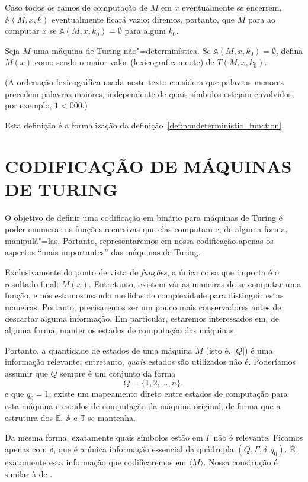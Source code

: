 Caso todos os ramos de computação de $M$ em $x$ eventualmente se encerrem,
$\mathbb A(M, x, k)$ eventualmente ficará vazio;
diremos,
portanto,
que $M$ para ao computar $x$ se $\mathbb A(M, x, k_0) = \emptyset$
para algum $k_0$.

\begin{definition}
    Seja $M$ uma máquina de Turing não"=determinística.
    Se $\mathbb A(M, x, k_0) = \emptyset$,
    defina $M(x)$ como sendo o maior valor
    (lexicograficamente)
    de $T(M, x, k_0)$.
\end{definition}
(A ordenação lexicográfica usada neste texto
considera que palavras menores precedem palavras maiores,
independente de quais símbolos estejam envolvidos;
por exemplo, $1 < 000$.)

Esta definição é a formalização da definição~\ref{def:nondeterministic_function}.

\section{CODIFICAÇÃO DE MÁQUINAS DE TURING}

O objetivo de definir uma codificação em binário para máquinas de Turing
é poder enumerar as funções recursivas que elas computam
e, de alguma forma,
manipulá"=las.
Portanto,
representaremos em nossa codificação apenas os aspectos ``mais importantes''
das máquinas de Turing.

Exclusivamente do ponto de vista de \emph{funções},
a única coisa que importa é o resultado final: $M(x)$.
Entretanto,
existem várias maneiras de se computar uma função,
e nós estamos usando medidas de complexidade para distinguir estas maneiras.
Portanto,
precisaremos ser um pouco mais conservadores antes de descartar alguma informação.
Em particular,
estaremos interessados em,
de alguma forma,
manter os estados de computação das máquinas.

Portanto, a quantidade de estados de uma máquina $M$
(isto é, $|Q|$)
é uma informação relevante;
entretanto,
\emph{quais} estados são utilizados não é.
Poderíamos assumir que $Q$ sempre é um conjunto da forma
\begin{equation*}
    Q = \{1, 2, \dots, n\},
\end{equation*}
e que $q_0 = 1$;
existe um mapeamento direto entre estados de computação para esta máquina
e estados de computação da máquina original,
de forma que a estrutura dos $\mathbb E$, $\mathbb A$ e $\mathbb T$ se mantenha.

Da mesma forma,
exatamente quais símbolos estão em $\Gamma$
não é relevante.
Ficamos apenas com $\delta$,
que é a única informação essencial da quádrupla $(Q, \Gamma, \delta, q_0)$.
É exatamente esta informação que codificaremos em $\langle M \rangle$.
Nossa construção é similar à de .

